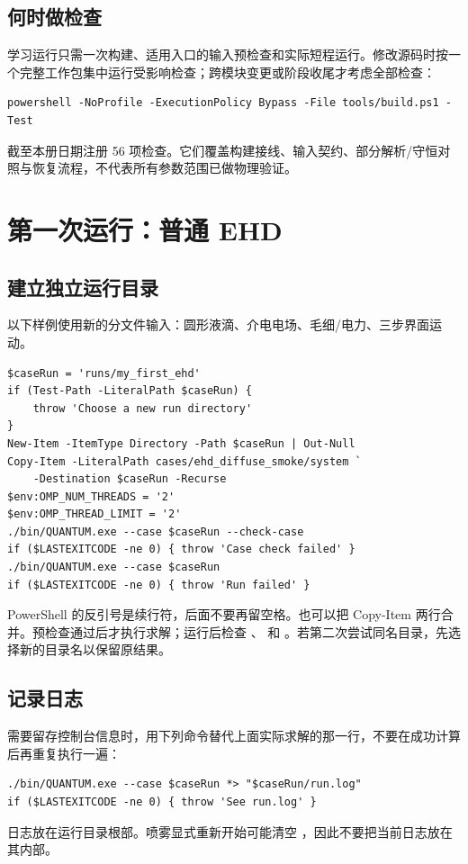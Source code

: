 \documentclass[a4paper,11pt]{article}
\begin{document}
\subsection{何时做检查}
学习运行只需一次构建、适用入口的输入预检查和实际短程运行。修改源码时按一个完整工作包集中运行受影响检查；跨模块变更或阶段收尾才考虑全部检查：
\begin{lstlisting}
powershell -NoProfile -ExecutionPolicy Bypass -File tools/build.ps1 -Test
\end{lstlisting}
截至本册日期注册 56 项检查。它们覆盖构建接线、输入契约、部分解析/守恒对照与恢复流程，不代表所有参数范围已做物理验证。

\section{第一次运行：普通 EHD}
\subsection{建立独立运行目录}
以下样例使用新的分文件输入：圆形液滴、介电电场、毛细/电力、三步界面运动。
\begin{lstlisting}
$caseRun = 'runs/my_first_ehd'
if (Test-Path -LiteralPath $caseRun) {
    throw 'Choose a new run directory'
}
New-Item -ItemType Directory -Path $caseRun | Out-Null
Copy-Item -LiteralPath cases/ehd_diffuse_smoke/system `
    -Destination $caseRun -Recurse
$env:OMP_NUM_THREADS = '2'
$env:OMP_THREAD_LIMIT = '2'
./bin/QUANTUM.exe --case $caseRun --check-case
if ($LASTEXITCODE -ne 0) { throw 'Case check failed' }
./bin/QUANTUM.exe --case $caseRun
if ($LASTEXITCODE -ne 0) { throw 'Run failed' }
\end{lstlisting}
PowerShell 的反引号是续行符，后面不要再留空格。也可以把 Copy-Item 两行合并。预检查通过后才执行求解；运行后检查 、 和 。若第二次尝试同名目录，先选择新的目录名以保留原结果。

\subsection{记录日志}
需要留存控制台信息时，用下列命令替代上面实际求解的那一行，不要在成功计算后再重复执行一遍：
\begin{lstlisting}
./bin/QUANTUM.exe --case $caseRun *> "$caseRun/run.log"
if ($LASTEXITCODE -ne 0) { throw 'See run.log' }
\end{lstlisting}
日志放在运行目录根部。喷雾显式重新开始可能清空 ，因此不要把当前日志放在其内部。
\end{document}
